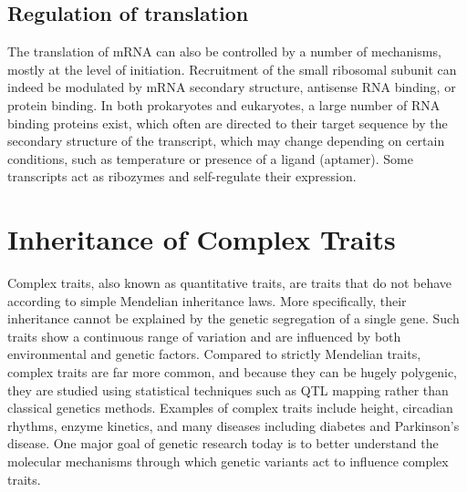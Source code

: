 \hypertarget{regulation-of-translation}{%
\section{Regulation of translation}\label{regulation-of-translation}}

The translation of mRNA can also be controlled by a number of mechanisms, mostly at the level of initiation. Recruitment of the small ribosomal subunit can indeed be modulated by mRNA secondary structure, antisense RNA binding, or protein binding. In both prokaryotes and eukaryotes, a large number of RNA binding proteins exist, which often are directed to their target sequence by the secondary structure of the transcript, which may change depending on certain conditions, such as temperature or presence of a ligand (aptamer). Some transcripts act as ribozymes and self-regulate their expression.

\hypertarget{inheritance-of-complex-traits}{%
\chapter{Inheritance of Complex Traits}\label{inheritance-of-complex-traits}}

Complex traits, also known as quantitative traits, are traits that do not behave according to simple Mendelian inheritance laws. More specifically, their inheritance cannot be explained by the genetic segregation of a single gene. Such traits show a continuous range of variation and are influenced by both environmental and genetic factors. Compared to strictly Mendelian traits, complex traits are far more common, and because they can be hugely polygenic, they are studied using statistical techniques such as QTL mapping rather than classical genetics methods. Examples of complex traits include height, circadian rhythms, enzyme kinetics, and many diseases including diabetes and Parkinson's disease. One major goal of genetic research today is to better understand the molecular mechanisms through which genetic variants act to influence complex traits.

